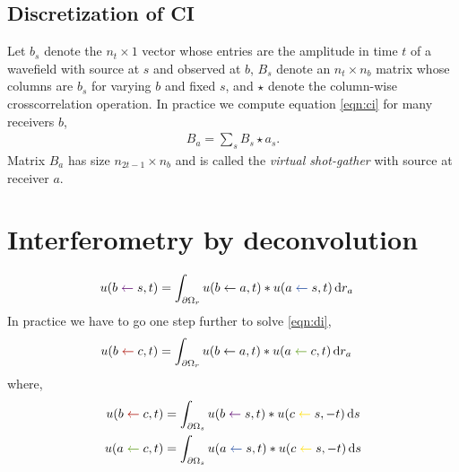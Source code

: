 \documentclass[a4paper,12pt]{article}
\begin{document}
\subsection*{Discretization of CI}
Let $b_s$ denote the $n_{t}\times 1$ vector whose entries are the amplitude in time $t$ of a wavefield with source at $s$ and observed at $b$, $B_s$ denote an $n_{t}\times n_b$ matrix whose columns are $b_s$ for varying $b$ and fixed $s$, and $\star$ denote the column-wise crosscorrelation operation. In practice we compute equation \ref{eqn:ci} for many receivers $b$, 
\begin{align}
B_a = \sum_s B_s \star a_s.
\end{align}
Matrix $B_a$ has size $n_{2t-1}\times n_b$ and is called the {\it virtual shot-gather} with source at receiver $a$.
\section*{Interferometry by deconvolution}
\begin{align}
u(b\color{moradoAmor}\gets\color{black}s,t) &= \int_{\partial\Omega_r} u(b\gets a,t)*u(a\color{boiseBlue}\gets\color{black}s,t)\,{\rm d}r_a
\label{eqn:di}
\end{align}
In practice we have to go one step further to solve \ref{eqn:di},
\begin{align}
u(b\color{rojoAmor}\gets\color{black}c,t) &= \int_{\partial\Omega_r} u(b\gets a,t)*u(a\color{verdeAmor}\gets\color{black}c,t)\,{\rm d}r_a
\label{eqn:di-by-ci}
\end{align}
where,
\begin{align}
u(b\color{rojoAmor}\gets\color{black}c,t) &= \int_{\partial\Omega_s} u(b\color{moradoAmor}\gets \color{black}s,t)*u(c\color{nyellow}\gets\color{black}s,-t)\,{\rm d}s\\
u(a\color{verdeAmor}\gets\color{black}c,t) &= \int_{\partial\Omega_s} u(a\color{boiseBlue}\gets \color{black}s,t)*u(c\color{nyellow}\gets\color{black}s,-t)\,{\rm d}s
\label{eqn:di-by-ci-2}
\end{align}
\end{document}

